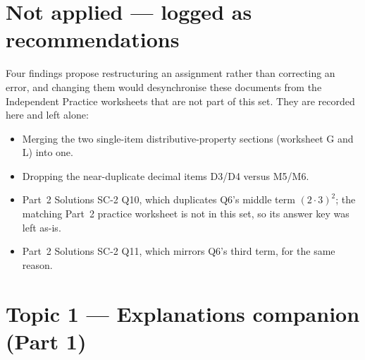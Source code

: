\documentclass[11pt]{article}
\begin{document}
\section*{Not applied --- logged as recommendations}
Four findings propose restructuring an assignment rather than correcting an
error, and changing them would desynchronise these documents from the
Independent Practice worksheets that are not part of this set. They are recorded
here and left alone:
\begin{itemize}
\item Merging the two single-item distributive-property sections (worksheet G and L) into one.
\item Dropping the near-duplicate decimal items D3/D4 versus M5/M6.
\item Part~2 Solutions SC-2 Q10, which duplicates Q6's middle term $(2\cdot3)^2$; the
      matching Part~2 practice worksheet is not in this set, so its answer key was left as-is.
\item Part~2 Solutions SC-2 Q11, which mirrors Q6's third term, for the same reason.
\end{itemize}
\newpage\section*{Topic 1 --- Explanations companion (Part 1)}
\end{document}
